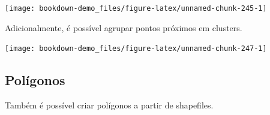 \documentclass[]{book}
\newenvironment{Shaded}{\begin{snugshade}}{\end{snugshade}}
\newcommand{\KeywordTok}[1]{\textcolor[rgb]{0.13,0.29,0.53}{\textbf{#1}}}
\newcommand{\DataTypeTok}[1]{\textcolor[rgb]{0.13,0.29,0.53}{#1}}
\newcommand{\FloatTok}[1]{\textcolor[rgb]{0.00,0.00,0.81}{#1}}
\newcommand{\StringTok}[1]{\textcolor[rgb]{0.31,0.60,0.02}{#1}}
\newcommand{\OperatorTok}[1]{\textcolor[rgb]{0.81,0.36,0.00}{\textbf{#1}}}
\newcommand{\NormalTok}[1]{#1}
\begin{document}
\begin{center}\texttt{[image: bookdown-demo\_files/figure-latex/unnamed-chunk-245-1]} \end{center}

Adicionalmente, é possível agrupar pontos próximos em clusters.

\begin{Shaded}
\end{Shaded}

\begin{center}\texttt{[image: bookdown-demo\_files/figure-latex/unnamed-chunk-247-1]} \end{center}

\subsection{Polígonos}\label{poligonos}

Também é possível criar polígonos a partir de shapefiles.
\end{document}
